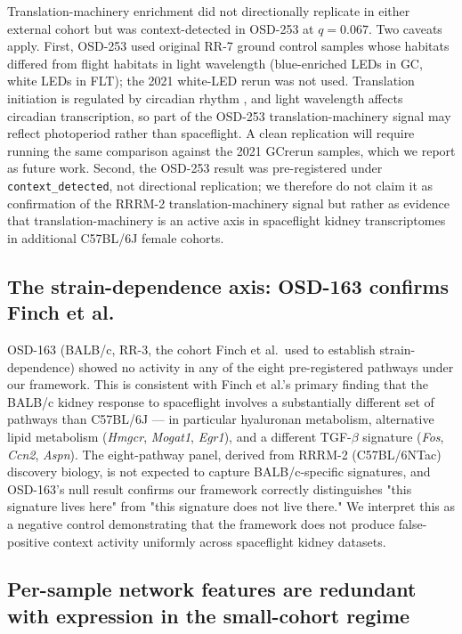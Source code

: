 \documentclass[11pt]{article}
\newcommand{\code}[1]{\texttt{#1}}
\newcommand{\gene}[1]{\textit{#1}}
\begin{document}
Translation-machinery enrichment did not directionally replicate in either external cohort but was context-detected in OSD-253 at $q = 0.067$. Two caveats apply. First, OSD-253 used original RR-7 ground control samples whose habitats differed from flight habitats in light wavelength (blue-enriched LEDs in GC, white LEDs in FLT); the 2021 white-LED rerun was not used. Translation initiation is regulated by circadian rhythm \citep{aviram2021circadian}, and light wavelength affects circadian transcription, so part of the OSD-253 translation-machinery signal may reflect photoperiod rather than spaceflight. A clean replication will require running the same comparison against the 2021 GCrerun samples, which we report as future work. Second, the OSD-253 result was pre-registered under \code{context\_detected}, not directional replication; we therefore do not claim it as confirmation of the RRRM-2 translation-machinery signal but rather as evidence that translation-machinery is an active axis in spaceflight kidney transcriptomes in additional C57BL/6J female cohorts.

\subsection{The strain-dependence axis: OSD-163 confirms Finch et al.}

OSD-163 (BALB/c, RR-3, the cohort Finch et al.\ used to establish strain-dependence) showed no activity in any of the eight pre-registered pathways under our framework. This is consistent with Finch et al.'s primary finding that the BALB/c kidney response to spaceflight involves a substantially different set of pathways than C57BL/6J --- in particular hyaluronan metabolism, alternative lipid metabolism (\gene{Hmgcr}, \gene{Mogat1}, \gene{Egr1}), and a different TGF-$\beta$ signature (\gene{Fos}, \gene{Ccn2}, \gene{Aspn}). The eight-pathway panel, derived from RRRM-2 (C57BL/6NTac) discovery biology, is not expected to capture BALB/c-specific signatures, and OSD-163's null result confirms our framework correctly distinguishes "this signature lives here" from "this signature does not live there." We interpret this as a negative control demonstrating that the framework does not produce false-positive context activity uniformly across spaceflight kidney datasets.

\subsection{Per-sample network features are redundant with expression in the small-cohort regime}
\end{document}
